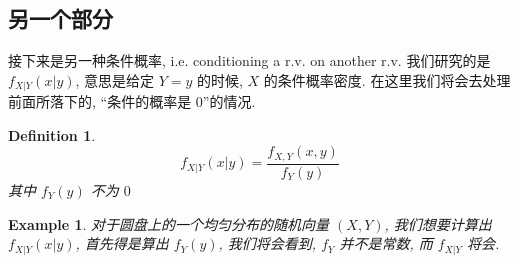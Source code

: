 \documentclass[a4paper, 10pt]{ctexart} %
\newtheorem{example}{Example}
\newtheorem{definition}{Definition}
\begin{document}
\subsection{另一个部分}
接下来是另一种条件概率, i.e. conditioning a r.v. on another r.v.
我们研究的是 $f _{X | Y} (x | y)$, 意思是给定 $Y= y$ 的时候, $X$ 的条件概率密度. 在这里我们将会去处理前面所落下的, 
``条件的概率是 $0$''的情况. 

\begin{definition}
    \[
    f _{X | Y} \left(x | y\right) = \frac{f _{X , Y} \left(x, y\right) }{ f_{Y} \left(y\right)}
    \]
    其中 $f_{Y} \left(y\right)$ 不为 $0$
\end{definition}
\begin{example}
    对于圆盘上的一个均匀分布的随机向量 $\left(X, Y\right)$, 我们想要计算出 $f _{X | Y} (x | y   )$, 
    首先得是算出 $f _{Y} \left(y\right)$, 我们将会看到, $f _{Y}$ 并不是常数, 而 $f _{X | Y}$ 将会.
\end{example}
\end{document}
